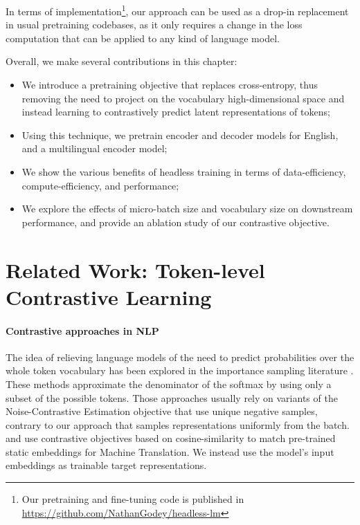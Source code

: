 In terms of implementation\footnote{Our pretraining and fine-tuning code is published in \url{https://github.com/NathanGodey/headless-lm}}, our approach can be used as a drop-in replacement in usual pretraining codebases, as it only requires a change in the loss computation that can be applied to any kind of language model.

Overall, we make several contributions in this chapter:
\begin{itemize}
    \item We introduce a pretraining objective that replaces cross-entropy, thus removing the need to project on the vocabulary high-dimensional space and instead learning to contrastively predict latent representations of tokens;
    \item Using this technique, we pretrain encoder and decoder models for English, and a multilingual encoder model;
    \item We show the various benefits of headless training in terms of data-efficiency, compute-efficiency, and performance;
    \item We explore the effects of micro-batch size and vocabulary size on downstream performance, and provide an ablation study of our contrastive objective. 
\end{itemize}



\section{Related Work: Token-level Contrastive Learning}

\paragraph{Contrastive approaches in NLP}
The idea of relieving language models of the need to predict probabilities over the whole token vocabulary has been explored in the importance sampling literature \citep{quick_train_bengio_03,mnih2012fast,jean-etal-2015-using, ma-collins-2018-noise}. These methods approximate the denominator of the softmax by using only a subset of the possible tokens. Those approaches usually rely on variants of the Noise-Contrastive Estimation objective \citep{nce} that use unique negative samples, contrary to our approach that samples representations uniformly from the batch. \citet{kumar2018vmf} and \citet{tokarchuk-niculae-2022-target} use contrastive objectives based on cosine-similarity to match pre-trained static embeddings for Machine Translation. 
% 
We instead use the model's input embeddings as trainable target representations.

